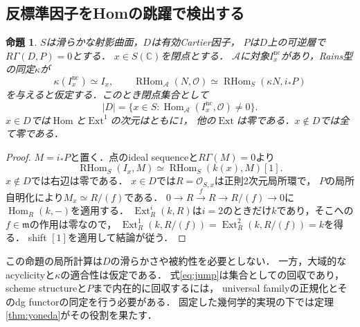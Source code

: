 \documentclass[11pt,a4paper]{ltjsarticle}
\newtheorem{proposition}[theorem]{命題}
\theoremstyle{definition}
\newcommand{\OO}{\mathcal O}
\renewcommand{\AA}{\mathcal A}
\newcommand{\RHom}{\operatorname{RHom}}
\newcommand{\Hom}{\operatorname{Hom}}
\newcommand{\Ext}{\operatorname{Ext}}
\begin{document}
\subsection{反標準因子をHomの跳躍で検出する}
\begin{proposition}\label{prop:jump}
$S$は滑らかな射影曲面，$D$は有効Cartier因子，
$P$は$D$上の可逆層で$R\Gamma(D,P)=0$とする．
$x\in S(\mathbb C)$を閉点とする．
$\AA$に対象$I_x^{\mathrm{nc}}$があり，Rains型の同定$\kappa$が
\[
 \kappa(I_x^{\mathrm{nc}})\simeq I_x,\qquad
 \RHom_{\AA}(N,\OO)\simeq\RHom_S(\kappa N,i_*P)
\]
を与えると仮定する．このとき閉点集合として
\begin{equation}\label{eq:jump}
 |D|=\{x\in S:\Hom_{\AA}(I_x^{\mathrm{nc}},\OO)\ne0\}.
\end{equation}
$x\in D$では$\Hom$と$\Ext^1$の次元はともに1，
他の$\Ext$は零である．$x\notin D$では全て零である．
\end{proposition}
\begin{proof}
$M=i_*P$と置く．点のideal sequenceと$R\Gamma(M)=0$より
\[
 \RHom_S(I_x,M)\simeq\RHom_S(k(x),M)[1].
\]
$x\notin D$では右辺は零である．
$x\in D$では$R=\OO_{S,x}$は正則2次元局所環で，
$P$の局所自明化により$M_x\simeq R/(f)$である．
$0\to R\xrightarrow{f}R\to R/(f)\to0$に$\Hom_R(k,-)$を適用する．
$\Ext_R^i(k,R)$は$i=2$のときだけ$k$であり，そこへの$f\in\mathfrak m$の作用は零なので，
$\Ext_R^1(k,R/(f))=\Ext_R^2(k,R/(f))=k$を得る．
shift $[1]$を適用して結論が従う．
\end{proof}

この命題の局所計算は$D$の滑らかさや被約性を必要としない．
一方，大域的なacyclicityと$\kappa$の適合性は仮定である．
式\eqref{eq:jump}は集合としての回収であり，
scheme structureと$P$まで内在的に回収するには，
universal familyの正規化とそのdg functorの同定を行う必要がある．
固定した幾何学的実現の下では定理\ref{thm:yoneda}がその役割を果たす．
\end{document}
